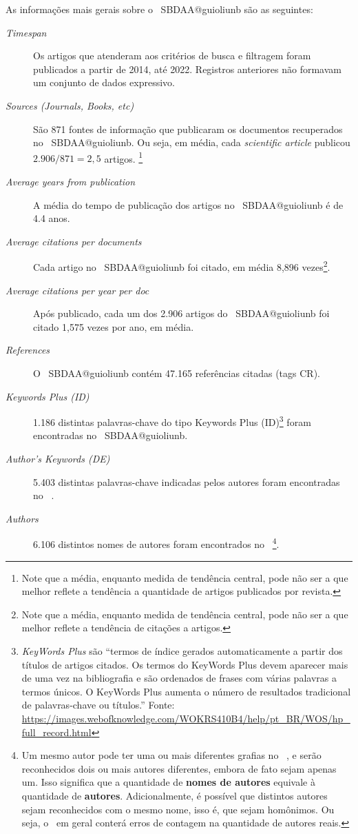 As informações mais gerais sobre o \dataset\   SBDAA@guioliunb são as seguintes:
\begin{description}
    \item [\textit{Timespan}] Os artigos que atenderam aos critérios de busca e filtragem foram publicados a partir de 2014, até 2022. Registros anteriores não formavam um conjunto de dados expressivo.
    \item [\textit{Sources (Journals, Books, etc)}] São 871 fontes de informação que publicaram os documentos recuperados no \dataset\   SBDAA@guioliunb. Ou seja, em média, cada \textit{scientific article} publicou $2.906/871=2,5$ artigos. \footnote{Note que a média, enquanto medida de tendência central, pode não ser a que melhor reflete a tendência a quantidade de artigos publicados por revista.}
    \item [\textit{Average years from publication}] A média do tempo de publicação dos artigos no \dataset\   SBDAA@guioliunb é de 4.4 anos.
    \item [\textit{Average citations per documents}] Cada artigo no \dataset\   SBDAA@guioliunb foi citado, em média 8,896 vezes\footnote{Note que a média, enquanto medida de tendência central, pode não ser a que melhor reflete a tendência de  citações a artigos.}.
    \item [\textit{Average citations per year per doc}] Após publicado, cada um dos 2.906 artigos do \dataset\   SBDAA@guioliunb  foi citado 1,575 vezes por ano, em média.
    \item [\textit{References}] O \dataset\   SBDAA@guioliunb contém 47.165 referências citadas (tags CR).
    \item [\textit{Keywords Plus (ID)}] 1.186 distintas palavras-chave do tipo Keywords Plus (ID)\footnote{\textit{KeyWords Plus} são ``termos de índice gerados automaticamente a partir dos títulos de artigos citados. Os termos do KeyWords Plus devem aparecer mais de uma vez na bibliografia e são ordenados de frases com várias palavras a termos únicos. O KeyWords Plus aumenta o número de resultados tradicional de palavras-chave ou títulos.'' Fonte: \url{https://images.webofknowledge.com/WOKRS410B4/help/pt_BR/WOS/hp_full_record.html}} foram encontradas no \dataset\   SBDAA@guioliunb. 
    \item [\textit{Author's Keywords (DE)}] 5.403 distintas palavras-chave indicadas pelos autores foram encontradas no \dataset\  .
    \item [\textit{Authors}] 6.106 distintos nomes de autores foram encontrados no \dataset\  \footnote{Um mesmo autor pode ter uma ou mais diferentes grafias no \dataset\  , e serão reconhecidos dois ou mais autores diferentes, embora de fato sejam apenas um. Isso significa que a quantidade de \textbf{nomes de autores} equivale à quantidade de \textbf{autores}. Adicionalmente, é possível que distintos autores sejam reconhecidos com o mesmo nome, isso é, que sejam homônimos. Ou seja, o \dataset\   em geral conterá erros de contagem na quantidade de autores reais.}.

\end{description}

